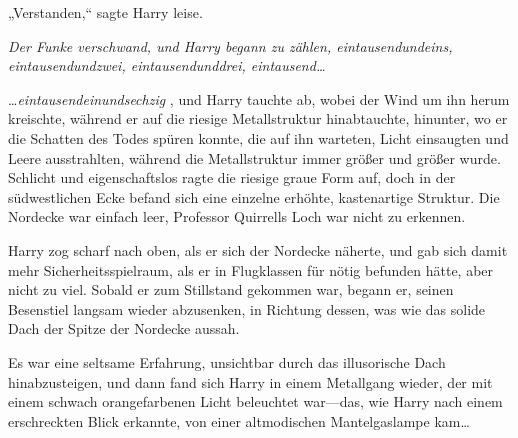 „Verstanden,“ sagte Harry leise.

\emph{Der Funke verschwand, und Harry begann zu zählen, \emph{eintausendundeins, eintausendundzwei, eintausendunddrei, eintausend…}}

…\emph{eintausendeinundsechzig} , und Harry tauchte ab, wobei der Wind um ihn herum kreischte, während er auf die riesige Metallstruktur hinabtauchte, hinunter, wo er die Schatten des Todes spüren konnte, die auf ihn warteten, Licht einsaugten und Leere ausstrahlten, während die Metallstruktur immer größer und größer wurde. Schlicht und eigenschaftslos ragte die riesige graue Form auf, doch in der südwestlichen Ecke befand sich eine einzelne erhöhte, kastenartige Struktur. Die Nordecke war einfach leer, Professor Quirrells Loch war nicht zu erkennen.

Harry zog scharf nach oben, als er sich der Nordecke näherte, und gab sich damit mehr Sicherheitsspielraum, als er in Flugklassen für nötig befunden hätte, aber nicht zu viel. Sobald er zum Stillstand gekommen war, begann er, seinen Besenstiel langsam wieder abzusenken, in Richtung dessen, was wie das solide Dach der Spitze der Nordecke aussah.

Es war eine seltsame Erfahrung, unsichtbar durch das illusorische Dach hinabzusteigen, und dann fand sich Harry in einem Metallgang wieder, der mit einem schwach orangefarbenen Licht beleuchtet war—das, wie Harry nach einem erschreckten Blick erkannte, von einer altmodischen Mantelgaslampe kam…

